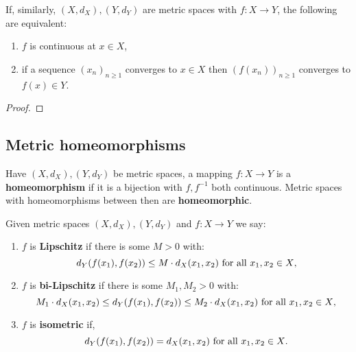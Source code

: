 \documentclass[../Year2.tex]{subfiles}
\begin{document}
\begin{proposition}
    If, similarly, $(X,d_X), (Y,d_Y)$ are metric spaces with $f:X\rightarrow Y$, the following are equivalent: \begin{enumerate}
        \item $f$ is continuous at $x\in X$,
        \item if a sequence ${(x_n)}_{n\geq 1}$ converges to $x\in X$ then ${(f(x_n))}_{n\geq 1}$ converges to $f(x)\in Y$.
    \end{enumerate}
    \begin{proof}
        
    \end{proof}
\end{proposition}

\subsection{Metric homeomorphisms}

\begin{definition}[Homeomorphism]
    Have $(X,d_X),(Y,d_Y)$ be metric spaces, a mapping $f:X\rightarrow Y$ is a \textbf{homeomorphism} if it is a bijection with $f,f^{-1}$ both continuous. Metric spaces with homeomorphisms between then are \textbf{homeomorphic}.
\end{definition}

\begin{definition}[Lipschitz]
    Given metric spaces $(X,d_X),(Y,d_Y)$ and $f:X\rightarrow Y$ we say:\begin{enumerate}
        \item  $f$ is \textbf{Lipschitz} if there is some $M>0$ with: 
        \[ d_Y(f(x_1),f(x_2))\leq M\cdot d_X(x_1,x_2) \ \text{\textcolor{black}{for all }} x_1,x_2\in X\text{\textcolor{black}{,}}\]
        \vspace{-20pt}
        \item  $f$ is \textbf{bi-Lipschitz} if there is some $M_1,M_2>0$ with: 
        \[ M_1\cdot d_X(x_1,x_2) \leq d_Y(f(x_1),f(x_2))\leq M_2\cdot d_X(x_1,x_2) \ \text{\textcolor{black}{for all }} x_1,x_2\in X\text{\textcolor{black}{,}}\]
        \vspace{-20pt}
        \item  $f$ is \textbf{isometric} if, 
        \[ d_Y(f(x_1),f(x_2)) =  d_X(x_1,x_2) \ \text{\textcolor{black}{for all }} x_1,x_2\in X\text{\textcolor{black}{.}}\]
        \vspace{-20pt}
    \end{enumerate}
\end{definition}
\end{document}
